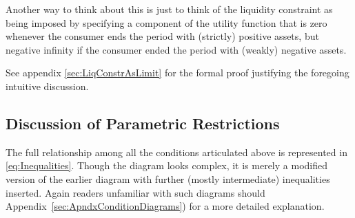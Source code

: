 \documentclass[BufferStockTheory]{subfiles}
\begin{document}
Another way to think about this is just to think of the liquidity
constraint as being imposed by specifying a component of the utility
function that is zero whenever the consumer ends the period with
(strictly) positive assets, but negative infinity if the consumer
ended the period with (weakly) negative assets.

See appendix \ref{sec:LiqConstrAsLimit} for the formal proof justifying the
foregoing intuitive discussion.

\hypertarget{Discussion-of-Parametric-Restrictions}{}
\subsection{Discussion of Parametric Restrictions}\label{sec:discussConvergence}

The full relationship among all the conditions articulated above is represented in \eqref{eq:Inequalities}.
Though the diagram looks complex, it is merely a modified version of the earlier diagram with further 
(mostly intermediate) inequalities inserted.  Again readers unfamiliar with such diagrams should Appendix~\ref{sec:ApndxConditionDiagrams}) for a more detailed explanation.

\renewcommand{\figName}{Inequalities} %
\renewcommand{\figFile}{\figName} %
\hypertarget{\figFile}{}
\hypertarget{\figName}{}
\end{document}
